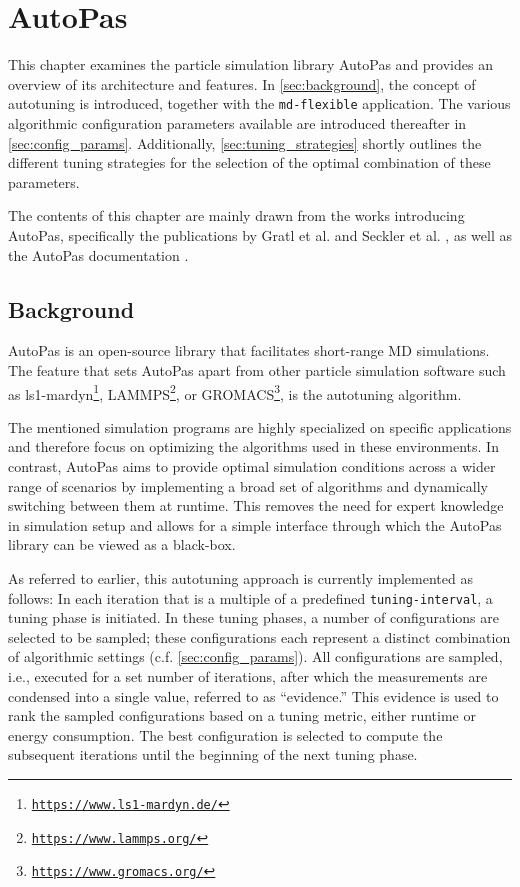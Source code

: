\chapter[AutoPas]{AutoPas}
\label{cp:autopas}

{
	\parindent0pt
	This chapter examines the particle simulation library AutoPas and provides an overview of its architecture and features. In \autoref{sec:background}, the concept of autotuning is introduced, together with the \texttt{md-flexible} application.
	The various algorithmic configuration parameters available  are introduced thereafter in \autoref{sec:config_params}. Additionally, \autoref{sec:tuning_strategies} shortly outlines the different tuning strategies for the selection of the optimal combination of these parameters.

	The contents of this chapter are mainly drawn from the works introducing AutoPas, specifically the publications by Gratl et al. \cite{Gratl2019, Gratl2021, GratlGassner2025} and Seckler et al. \cite{Seckler2021}, as well as the AutoPas documentation \cite{AutoPas2025}.
}


\section{Background}
\label{sec:background}
AutoPas is an open-source \CC{} library that facilitates short-range MD simulations. The feature that sets AutoPas apart from other particle simulation software such as ls1-mardyn\footnote{\href{https://www.ls1-mardyn.de/}{\texttt{https://www.ls1-mardyn.de/}}}, LAMMPS\footnote{\href{https://www.lammps.org/}{\texttt{https://www.lammps.org/}}}, or GROMACS\footnote{\href{https://www.gromacs.org/}{\texttt{https://www.gromacs.org/}}}, is the autotuning algorithm.

The mentioned simulation programs are highly specialized on specific applications and therefore focus on optimizing the algorithms used in these environments.
In contrast, AutoPas aims to provide optimal simulation conditions across a wider range of scenarios by implementing a broad set of algorithms and dynamically switching between them at runtime.
This removes the need for expert knowledge in simulation setup and allows for a simple interface through which the AutoPas library can be viewed as a black-box.

As referred to earlier, this autotuning approach is currently implemented as follows: In each iteration that is a multiple of a predefined \texttt{tuning-interval}, a tuning phase is initiated. In these tuning phases, a number of configurations are selected to be sampled; these configurations each represent a distinct combination of algorithmic settings (c.f. \autoref{sec:config_params}). All configurations are sampled, i.e., executed for a set number of iterations, after which the measurements are condensed into a single value, referred to as \enquote{evidence.} This evidence is used to rank the sampled configurations based on a tuning metric, either runtime or energy consumption. The best configuration is selected to compute the subsequent iterations until the beginning of the next tuning phase.


